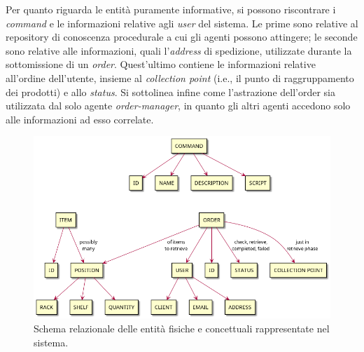 Per quanto riguarda le entità puramente informative, si possono riscontrare i \textit{command} e le informazioni relative agli \textit{user} del sistema. Le prime sono relative al repository di conoscenza procedurale a cui gli agenti possono attingere; le seconde sono relative alle informazioni, quali l'\textit{address} di spedizione, utilizzate durante la sottomissione di un \textit{order}. Quest'ultimo contiene le informazioni relative all'ordine dell'utente, insieme al \textit{collection point} (i.e., il punto di raggruppamento dei prodotti) e allo \textit{status}. Si sottolinea infine come l'astrazione dell'order sia utilizzata dal solo agente \textit{order-manager}, in quanto gli altri agenti accedono solo alle informazioni ad esso correlate.
\begin{figure}[!ht]\centering
    \includegraphics[width=\textwidth]{section/design/figure/ontology/ontology-abstractions.png}
    \caption{Schema relazionale delle entità fisiche e concettuali rappresentate nel sistema.}
    \label{fig:ontology_abstractions}
\end{figure}

